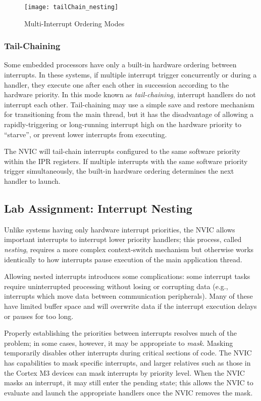 \documentclass[openany,11pt,fleqn]{book} %
\begin{document}
\begin{figure}[]
    \centering\texttt{[image: tailChain\_nesting]}
    \caption{Multi-Interrupt Ordering Modes}
    \label{tailChain_nesting}
\end{figure}

\subsubsection{Tail-Chaining}
Some embedded processors have only a built-in hardware ordering between interrupts. In these systems, if multiple interrupt trigger concurrently or during a handler, they execute one after each other in succession according to the hardware priority. In this mode known as \textit{tail-chaining}, interrupt handlers do not interrupt each other. Tail-chaining may use a simple save and restore mechanism for transitioning from the main thread, but it has the disadvantage of allowing a rapidly-triggering or long-running interrupt high on the hardware priority to ``starve'', or prevent lower interrupts from executing. 

The NVIC will tail-chain interrupts configured to the same software priority within the IPR registers. If multiple interrupts with the same software priority trigger simultaneously, the built-in hardware ordering determines the next handler to launch.

\subsection{\color{blue}Lab Assignment: Interrupt Nesting}
Unlike systems having only hardware interrupt priorities, the NVIC allows important interrupts to interrupt lower priority handlers; this process, called \textit{nesting}, requires a more complex context-switch mechanism but otherwise works identically to how interrupts pause execution of the main application thread. 

Allowing nested interrupts introduces some complications: some interrupt tasks require uninterrupted processing without losing or corrupting data (e.g., interrupts which move data between communication peripherals). Many of these have limited buffer space and will overwrite data if the interrupt execution delays or pauses for too long. 

Properly establishing the priorities between interrupts resolves much of the problem; in some cases, however, it may be appropriate to \textit{mask}. Masking temporarily disables other interrupts during critical sections of code. The NVIC has capabilities to mask specific interrupts, and larger relatives such as those in the Cortex M3 devices can mask interrupts by priority level. When the NVIC masks an interrupt, it may still enter the pending state; this allows the NVIC to evaluate and launch the appropriate handlers once the NVIC removes the mask.
\end{document}
